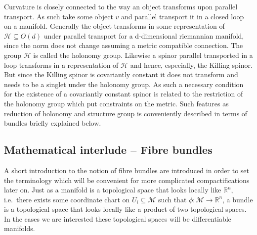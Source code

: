 Curvature is closely connected to the way an object transforms upon parallel transport. As such take some object $v$ and parallel transport it in a closed loop on a manifold. Generally the object transforms in some representation of $\mathscr{H}\subseteq O(d)$ under parallel transport for a d-dimensional riemannian manifold, since the norm does not change assuming a metric compatible connection. The group $\mathscr{H}$ is called the holonomy group. Likewise a spinor parallel transported in a loop transforms in a representation of $\mathscr{H}$ and hence, especially, the Killing spinor. But since the Killing spinor is covariantly constant it does not transform and needs to be a singlet under the holonomy group. As such a necessary condition for the existence of a covariantly constant spinor is related to the restriction of the holonomy group which put constraints on the metric. Such features as reduction of holonomy and structure group is conveniently described in terms of bundles briefly explained below.

\subsection{Mathematical interlude -- Fibre bundles}
A short introduction to the notion of fibre bundles are introduced in order to set the terminology which will be convenient for more complicated compactifications later on. Just as a manifold is a topological space that looks locally like $\mathbb{R}^n$, i.e.\ there exists some coordinate chart on $U_i\subseteq \mathcal{M}$ such that $\phi: \mathcal{M}\to \mathbb{R}^n$, a bundle is a topological space that looks locally like a product of two topological spaces. In the cases we are interested these topological spaces will be differentiable manifolds. 

